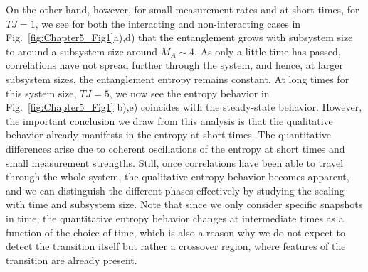 On the other hand, however, for small measurement rates and at short times, for $TJ = 1$, we see for both the interacting and non-interacting cases in Fig.~\ref{fig:Chapter5_Fig1}a),d) that the entanglement grows with subsystem size to around a subsystem size around $M_A \sim 4$. As only a little time has passed, correlations have not spread further through the system, and hence, at larger subsystem sizes, the entanglement entropy remains constant. At long times for this system size, $TJ = 5$, we now see the entropy behavior in Fig.~\ref{fig:Chapter5_Fig1} b),e) coincides with the steady-state behavior. However, the important conclusion we draw from this analysis is that the qualitative behavior already manifests in the entropy at short times. The quantitative differences arise due to coherent oscillations of the entropy at short times and small measurement strengths. Still, once correlations have been able to travel through the whole system, the qualitative entropy behavior becomes apparent, and we can distinguish the different phases effectively by studying the scaling with time and subsystem size. Note that since we only consider specific snapshots in time, the quantitative entropy behavior changes at intermediate times as a function of the choice of time, which is also a reason why we do not expect to detect the transition itself but rather a crossover region, where features of the transition are already present.

